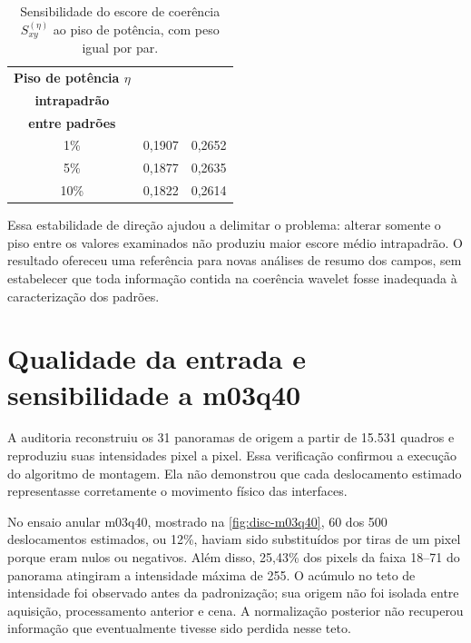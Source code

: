 \begin{table}[htbp]
  \centering
  \caption{Sensibilidade do escore de coerência $S_{xy}^{(\eta)}$ ao piso de potência,
  com peso igual por par.}
  \label{tab:disc-pisos}
  \begin{tabular}{c r r}
    \hline
    \textbf{Piso de potência $\eta$} &
    \shortstack{\textbf{Escore médio}\\\textbf{intrapadrão}} &
    \shortstack{\textbf{Escore médio}\\\textbf{entre padrões}}\\
    \hline
    1\% & 0,1907 & 0,2652\\
    5\% & 0,1877 & 0,2635\\
    10\% & 0,1822 & 0,2614\\
    \hline
  \end{tabular}
\end{table}

Essa estabilidade de direção ajudou a delimitar o problema: alterar somente o piso
entre os valores examinados não produziu maior escore médio intrapadrão.
O resultado ofereceu uma referência para novas análises de resumo dos campos,
sem estabelecer que toda informação contida na coerência wavelet fosse inadequada
à caracterização dos padrões.

\section{Qualidade da entrada e sensibilidade a m03q40}\label{sec:disc-qualidade}

A auditoria reconstruiu os 31 panoramas de origem a partir de 15.531 quadros
e reproduziu suas intensidades pixel a pixel. Essa verificação confirmou a execução
do algoritmo de montagem. Ela não demonstrou que cada deslocamento estimado
representasse corretamente o movimento físico das interfaces.

No ensaio anular m03q40, mostrado na \autoref{fig:disc-m03q40}, 60 dos 500
deslocamentos estimados, ou 12\%, haviam sido substituídos por tiras de um pixel
porque eram nulos ou negativos. Além disso, 25,43\% dos pixels da faixa 18--71
do panorama atingiram a intensidade máxima de 255. O acúmulo no teto de intensidade
foi observado antes da padronização; sua origem não foi isolada entre aquisição,
processamento anterior e cena. A normalização posterior não recuperou informação
que eventualmente tivesse sido perdida nesse teto.

